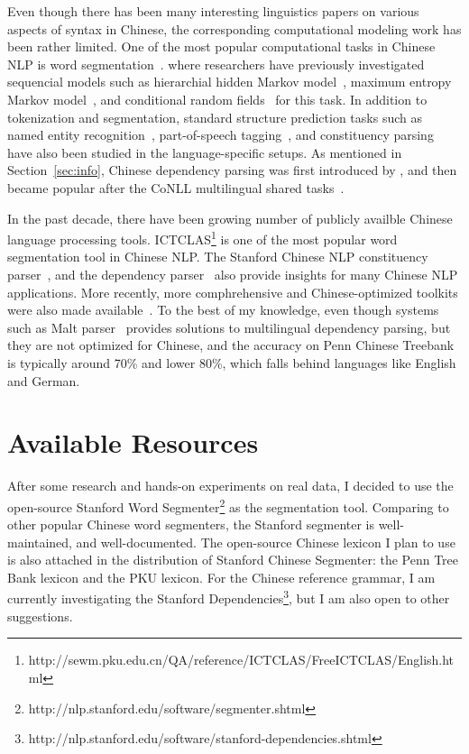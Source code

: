 \documentclass[11pt,letterpaper]{article}
\begin{document}
Even though there has been many interesting linguistics papers on various aspects
of syntax in Chinese, the corresponding computational modeling work has been rather limited.
One of the most popular computational tasks in Chinese NLP is word segmentation~\citep{xue2003chinese,sproat2003first}.
where researchers have previously investigated sequencial models such as
hierarchial hidden Markov model~\citep{zhang2003hhmm}, maximum entropy Markov model~\citep{xue2003chinese}, and conditional random fields~\citep{zhao2006improved} for this task.
In addition to tokenization and segmentation, standard structure prediction tasks such as 
named entity recognition~\citep{xue2003chinese,wu2005chinese}, part-of-speech tagging~\citep{ng2004chinese,jiang2008cascaded}, and constituency parsing~\citep{wu1997stochastic,wang2006fast}
have also been studied in the language-specific setups.
As mentioned in Section~\ref{sec:info}, Chinese dependency parsing was first introduced
by \cite{bikel2000two}, and then became popular after the CoNLL multilingual shared tasks~\citep{buchholz2006conll,nilsson2007conll}.

In the past decade, there have been growing number of publicly availble Chinese language processing tools.
ICTCLAS\footnote{http://sewm.pku.edu.cn/QA/reference/ICTCLAS/FreeICTCLAS/English.html} is one of the most popular word segmentation tool in Chinese NLP. The Stanford Chinese NLP constituency parser~\citep{levy2003harder},
and the dependency parser~\citep{chang2009discriminative} also provide insights for many Chinese NLP applications.
More recently, more comphrehensive and Chinese-optimized toolkits were also made available~\citep{qiu2013fudannlp,che2010ltp}.
To the best of my knowledge, even though systems such as Malt parser~\citep{nivre2007maltparser} provides solutions 
to multilingual dependency parsing, but they are not optimized for Chinese, and the accuracy on Penn Chinese Treebank is
typically around 70\% and lower 80\%, which falls behind languages like English and German.

\section{Available Resources}
After some research and hands-on experiments on real data, I decided to use the open-source Stanford Word Segmenter\footnote{http://nlp.stanford.edu/software/segmenter.shtml} as the
segmentation tool. Comparing to other popular Chinese word segmenters, the Stanford segmenter
is well-maintained, and well-documented. The open-source Chinese lexicon I plan to use
is also attached in the distribution of Stanford Chinese Segmenter: the Penn Tree Bank lexicon
and the PKU lexicon. For the Chinese reference grammar, I am currently investigating the 
Stanford Dependencies\footnote{http://nlp.stanford.edu/software/stanford-dependencies.shtml},
but I am also open to other suggestions.
\end{document}
